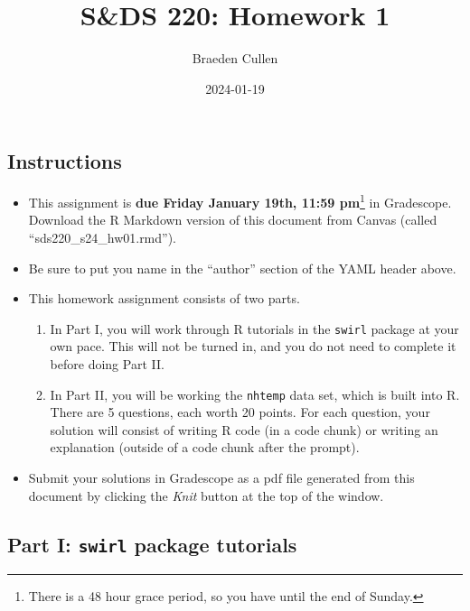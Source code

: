 \documentclass[
]{article}
\title{S\&DS 220: Homework 1}
\author{Braeden Cullen}
\date{2024-01-19}
\providecommand{\tightlist}{%
  \setlength{\itemsep}{0pt}\setlength{\parskip}{0pt}}
\begin{document}
\maketitle

\hypertarget{instructions}{%
\subsection{Instructions}\label{instructions}}

\begin{itemize}
\tightlist
\item
  This assignment is \textbf{due Friday January 19th, 11:59
  pm}\footnote{There is a 48 hour grace period, so you have until the
    end of Sunday.} in Gradescope. Download the R Markdown version of
  this document from Canvas (called ``sds220\_s24\_hw01.rmd'').
\item
  Be sure to put you name in the ``author'' section of the YAML header
  above.
\item
  This homework assignment consists of two parts.

  \begin{enumerate}
  \def\labelenumi{\arabic{enumi}.}
  \tightlist
  \item
    In Part I, you will work through R tutorials in the \texttt{swirl}
    package at your own pace. This will not be turned in, and you do not
    need to complete it before doing Part II.
  \item
    In Part II, you will be working the \texttt{nhtemp} data set, which
    is built into R. There are 5 questions, each worth 20 points. For
    each question, your solution will consist of writing R code (in a
    code chunk) or writing an explanation (outside of a code chunk after
    the prompt).
  \end{enumerate}
\item
  Submit your solutions in Gradescope as a pdf file generated from this
  document by clicking the \emph{Knit} button at the top of the window.
\end{itemize}

\newpage

\hypertarget{part-i-swirl-package-tutorials}{%
\subsection{\texorpdfstring{Part I: \texttt{swirl} package
tutorials}{Part I: swirl package tutorials}}\label{part-i-swirl-package-tutorials}}
\end{document}

